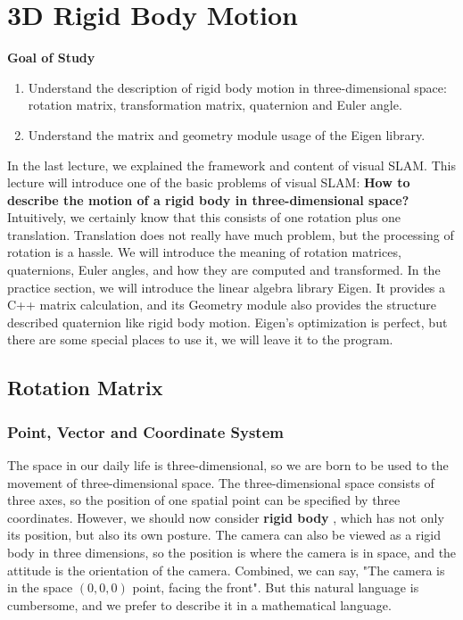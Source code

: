 \chapter{3D Rigid Body Motion}

\begin{mdframed}
	\textbf{Goal of Study}
	\begin{enumerate}
		\item Understand the description of rigid body motion in three-dimensional space: rotation matrix, transformation matrix, quaternion and Euler angle.
		\item Understand the matrix and geometry module usage of the Eigen library.
	\end{enumerate}
\end{mdframed}

In the last lecture, we explained the framework and content of visual SLAM. This lecture will introduce one of the basic problems of visual SLAM: \textbf{ How to describe the motion of a rigid body in three-dimensional space?} Intuitively, we certainly know that this consists of one rotation plus one translation. Translation does not really have much problem, but the processing of rotation is a hassle. We will introduce the meaning of rotation matrices, quaternions, Euler angles, and how they are computed and transformed. In the practice section, we will introduce the linear algebra library Eigen. It provides a C++ matrix calculation, and its Geometry module also provides the structure described quaternion like rigid body motion. Eigen's optimization is perfect, but there are some special places to use it, we will leave it to the program.

\section{Rotation Matrix}
\label{sec:3.1}
\subsection{Point, Vector and Coordinate System}
The space in our daily life is three-dimensional, so we are born to be used to the movement of three-dimensional space. The three-dimensional space consists of three axes, so the position of one spatial point can be specified by three coordinates. However, we should now consider \textbf{rigid body} , which has not only its position, but also its own posture. The camera can also be viewed as a rigid body in three dimensions, so the position is where the camera is in space, and the attitude is the orientation of the camera. Combined, we can say, "The camera is in the space $ ( 0, 0 , 0 ) $ point, facing the front". But this natural language is cumbersome, and we prefer to describe it in a mathematical language.

